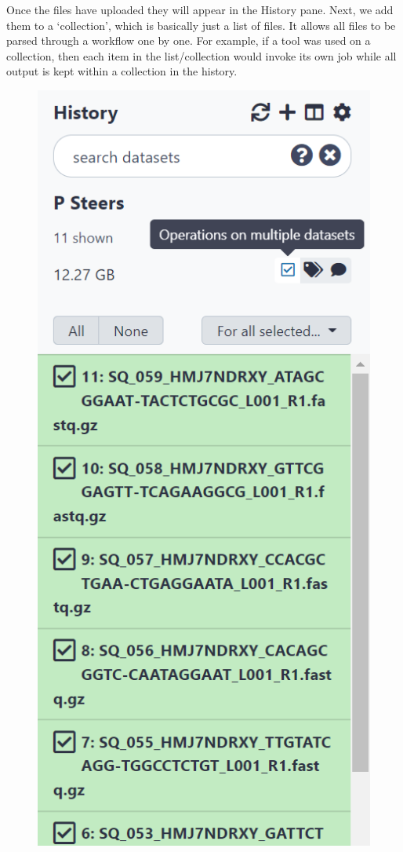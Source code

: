 \documentclass[
]{book}
\begin{document}
Once the files have uploaded they will appear in the History pane. Next, we add them to a `collection', which is basically just a list of files. It allows all files to be parsed through a workflow one by one. For example, if a tool was used on a collection, then each item in the list/collection would invoke its own job while all output is kept within a collection in the history.

\begin{figure}

{\centering \includegraphics[width=5.94in]{images/image005} 

}
\end{figure}
\end{document}
